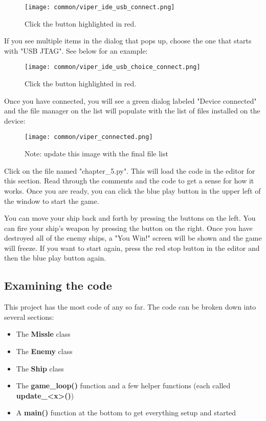 \begin{figure}[H]
    \centering
    \texttt{[image: common/viper\_ide\_usb\_connect.png]}
    \caption{Click the button highlighted in red.}
\end{figure}

If you see multiple items in the dialog that pops up, choose the one that starts with "USB JTAG". See below for an example:
\begin{figure}[H]
    \centering
    \texttt{[image: common/viper\_ide\_usb\_choice\_connect.png]}
    \caption{Click the button highlighted in red.}
\end{figure}

Once you have connected, you will see a green dialog labeled "Device connected" and the file manager on the list
will populate with the list of files installed on the device:
\begin{figure}[H]
    \centering
    \texttt{[image: common/viper\_connected.png]}
    \caption{Note: update this image with the final file list}
\end{figure}

Click on the file named "chapter\_5.py". This will load the code in the editor for this section. Read through the comments
and the code to get a sense for how it works. Once you are ready, you can click the blue play button in the upper left of the window
to start the game.

You can move your ship back and forth by pressing the buttons on the left. You can fire your ship's weapon by pressing the
button on the right. Once you have destroyed all of the enemy ships, a "You Win!" screen will be shown and the game will freeze.
If you want to start again, press the red stop button in the editor and then the blue play button again.

\subsection{Examining the code}

This project has the most code of any so far. The code can be broken down into several sections:
\begin{itemize}
    \item The \textbf{Missle} class
    \item The \textbf{Enemy} class
    \item The \textbf{Ship} class
    \item The \textbf{game\_loop()} function and a few helper functions (each called \textbf{update\_<x>()})
    \item A \textbf{main()} function at the bottom to get everything setup and started
\end{itemize}

